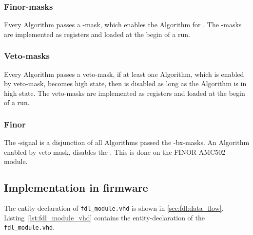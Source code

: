 \subsubsection{Finor-masks}
\label{sec:fdl:finor_masks}

Every Algorithm passes a \finor-mask, which enables the Algorithm for \finor.
The \finor-masks are implemented as registers and loaded at the begin of a run.

\subsubsection{Veto-masks}
\label{sec:fdl:veto_masks}

Every Algorithm passes a veto-mask, if at least one Algorithm, which is enabled by veto-mask, becomes high state, then \finor is disabled as long as the Algorithm is in high state.
The veto-masks are implemented as registers and loaded at the begin of a run.

\subsubsection{Finor}
\label{sec:fdl:finor}

The \finor-signal is a disjunction of all Algorithms passed the \finor-bx-masks. An Algorithm enabled by veto-mask, disables the \finor. This is done on the FINOR-AMC502 module.

\subsection{Implementation in firmware}
\label{sec:fdl:implementation_firmware}

The entity-declaration of \texttt{fdl\_module.vhd} is shown in \ref{sec:fdl:data_flow}.\\

Listing~\ref{lst:fdl_module_vhd} contains the entity-declaration of the \texttt{fdl\_module.vhd}.\\



\clearpage

